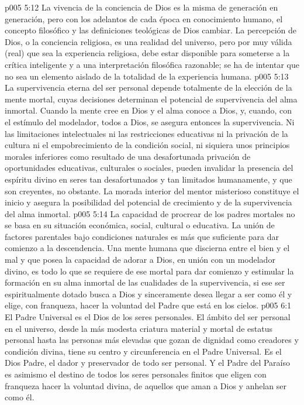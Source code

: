 \vs p005 5:12 La vivencia de la conciencia de Dios es la misma de generación en generación, pero con los adelantos de cada época en conocimiento humano, el concepto filosófico y las definiciones teológicas de Dios  cambiar. La percepción de Dios, o la conciencia religiosa, es una realidad del universo, pero por muy válida (real) que sea la experiencia religiosa, debe estar disponible para someterse a la crítica inteligente y a una interpretación filosófica razonable; se ha de intentar que no sea un elemento aislado de la totalidad de la experiencia humana.
\vs p005 5:13 \pc La supervivencia eterna del ser personal depende totalmente de la elección de la mente mortal, cuyas decisiones determinan el potencial de supervivencia del alma inmortal. Cuando la mente cree en Dios y el alma conoce a Dios, y, cuando, con el estímulo del modelador, todos  a Dios, se asegura entonces la supervivencia. Ni las limitaciones intelectuales ni las restricciones educativas ni la privación de la cultura ni el empobrecimiento de la condición social, ni siquiera unos principios morales inferiores como resultado de una desafortunada privación de oportunidades educativas, culturales o sociales, pueden invalidar la presencia del espíritu divino en seres tan desafortunados y tan limitados humanamente, y que son creyentes, no obstante. La morada interior del mentor misterioso constituye el inicio y asegura la posibilidad del potencial de crecimiento y de la supervivencia del alma inmortal.
\vs p005 5:14 La capacidad de procrear de los padres mortales no se basa en su situación económica, social, cultural o educativa. La unión de factores parentales bajo condiciones naturales es más que suficiente para dar comienzo a la descendencia. Una mente humana que discierna entre el bien y el mal y que posea la capacidad de adorar a Dios, en unión con un modelador divino, es todo lo que se requiere de ese mortal para dar comienzo y estimular la formación en su alma inmortal de las cualidades de la supervivencia, si ese ser espiritualmente dotado busca a Dios y sinceramente desea llegar a ser como él y elige, con franqueza, hacer la voluntad del Padre que está en los cielos.
\vs p005 6:1 El Padre Universal es el Dios de los seres personales. El ámbito del ser personal en el universo, desde la más modesta criatura material y mortal de estatus personal hasta las personas más elevadas que gozan de dignidad como creadores y condición divina, tiene su centro y circunferencia en el Padre Universal. Es el Dios Padre, el dador y preservador de todo ser personal. Y el Padre del Paraíso es asimismo el destino de todos los seres personales finitos que eligen con franqueza hacer la voluntad divina, de aquellos que aman a Dios y anhelan ser como él.
